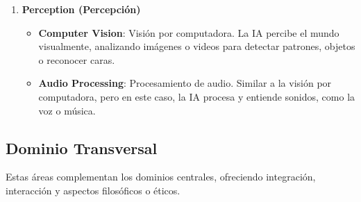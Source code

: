\begin{enumerate}
\item \textbf{Perception (Percepción)}
  \begin{itemize}
    \item \textbf{Computer Vision}: Visión por computadora. La IA percibe el mundo visualmente, analizando imágenes o videos para detectar patrones, objetos o reconocer caras.
    \item \textbf{Audio Processing}: Procesamiento de audio. Similar a la visión por computadora, pero en este caso, la IA procesa y entiende sonidos, como la voz o música.
  \end{itemize}
\end{enumerate}

\subsection{Dominio Transversal}\label{dominio-transversal}

Estas áreas complementan los dominios centrales, ofreciendo integración, interacción y aspectos filosóficos o éticos.

